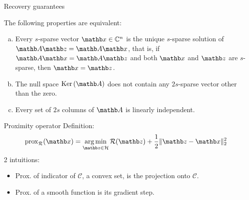 \begin{frame}{Recovery guarantees}
    \begin{theorem}
        The following properties are equivalent:
\begin{enumerate}[(a)]
    \item Every $s$-sparse vector $\xb \in \mathbb{C}^n$ is the unique $s$-sparse solution of $\Ab \zb = \Ab \xb$, that is, if $\Ab \xb = \Ab \zb$ and both $\xb$ and $\zb$ are $s$-sparse, then $\xb = \zb$.
    \item The null space $\ker(\Ab)$ does not contain any $2s$-sparse vector other than the zero.
    \item Every set of $2s$ columns of $\Ab$ is linearly independent.
\end{enumerate}
    \end{theorem}
\end{frame}

\begin{frame}{Proximity operator}
    Definition:
    \begin{equation*}
        \operatorname{prox}_{\mathcal{R}}(\xb) = \argmin_{\zb \in \mathcal{H}} \mathcal{R}(\zb) + \frac12\|\zb - \xb\|_2^2
    \end{equation*}
    2 intuitions:
    \begin{itemize}
        \item Prox. of indicator of $\mathcal{C}$, a convex set, is the projection onto $\mathcal{C}$.
        \item Prox. of a smooth function is its gradient step.
    \end{itemize}
\end{frame}

